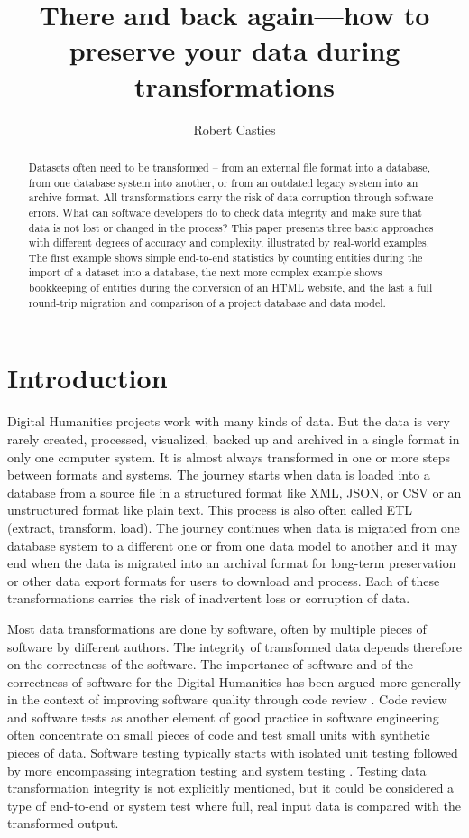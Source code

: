 \documentclass[final]{anthology-ch} %
\title{There and back again---how to preserve your data during transformations}
\author[1]{Robert Casties}[
  orcid=0009-0008-9370-1303
]
\affiliation{1}{Digital Humanities Team, Max Planck Institute for History of Science, Berlin, Germany}
\begin{document}
\maketitle

\begin{abstract}
Datasets often need to be transformed -- from an external file format into a database, from one database system into another, or from an outdated legacy system into an archive format. All transformations carry the risk of data corruption through software errors. What can software developers do to check data integrity and make sure that data is not lost or changed in the process? This paper presents three basic approaches with different degrees of accuracy and complexity, illustrated by real-world examples. The first example shows simple end-to-end statistics by counting entities during the import of a dataset into a database, the next more complex example shows bookkeeping of entities during the conversion of an HTML website, and the last a full round-trip migration and comparison of a project database and data model.
\end{abstract}

\section{Introduction}

Digital Humanities projects work with many kinds of data. But the data is very rarely created, processed, visualized, backed up and archived in a single format in only one computer system. It is almost always transformed in one or more steps between formats and systems. The journey starts when data is loaded into a database from a source file in a structured format like XML, JSON, or CSV or an unstructured format like plain text. This process is also often called ETL (extract, transform, load). The journey continues when data is migrated from one database system to a different one or from one data model to another and it may end when the data is migrated into an archival format for long-term preservation or other data export formats for users to download and process. Each of these transformations carries the risk of inadvertent loss or corruption of data.

Most data transformations are done by software, often by multiple pieces of software by different authors. The integrity of transformed data depends therefore on the correctness of the software. The importance of software and of the correctness of software for the Digital Humanities has been argued more generally in  the context of improving software quality through code review \autocite{damerow_code_2025}. Code review and software tests as another element of good practice in software engineering often concentrate on small pieces of code and test small units with synthetic pieces of data. Software testing typically starts with isolated unit testing followed by more encompassing integration testing and system testing \autocite{leloudas_introduction_2023}. Testing data transformation integrity is not explicitly mentioned, but it could be considered a type of end-to-end or system test where full, real input data is compared with the transformed output.
\end{document}
